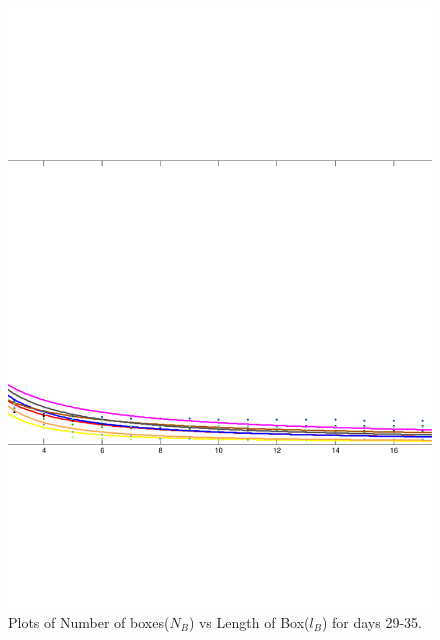 \documentclass{article}
\begin{document}
\begin{figure}
\centering
\includegraphics[scale=0.3]{plot5/plot5}
\caption{Plots of Number of boxes($N_B$) vs Length of Box($l_B$) for days 29-35.}
\end{figure}
\end{document}
